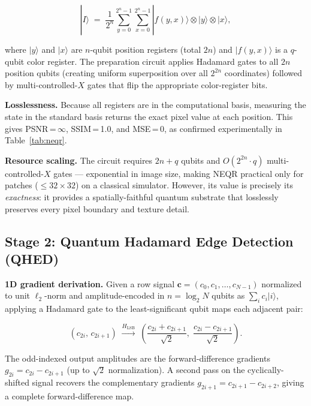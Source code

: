 \documentclass[journal]{IEEEtran}
\newcommand{\qket}[1]{|#1\rangle}
\begin{document}
\begin{equation}
  \qket{I} \;=\; \frac{1}{2^n} \sum_{y=0}^{2^n-1} \sum_{x=0}^{2^n-1}
  \qket{f(y,x)} \otimes \qket{y} \otimes \qket{x},
  \label{eq:neqr}
\end{equation}

where $\qket{y}$ and $\qket{x}$ are $n$-qubit position registers
(total $2n$) and $\qket{f(y,x)}$ is a $q$-qubit color register.  The
preparation circuit applies Hadamard gates to all $2n$ position qubits
(creating uniform superposition over all $2^{2n}$ coordinates) followed by
multi-controlled-$X$ gates that flip the appropriate color-register bits.

\textbf{Losslessness.}
Because all registers are in the computational basis, measuring the state
in the standard basis returns the exact pixel value at each position.
This gives PSNR\,=\,$\infty$, SSIM\,=\,1.0, and MSE\,=\,0, as confirmed
experimentally in Table~\ref{tab:neqr}.

\textbf{Resource scaling.}
The circuit requires $2n + q$ qubits and $O(2^{2n} \cdot q)$
multi-controlled-$X$ gates — exponential in image size, making NEQR
practical only for patches ($\leq 32\times32$) on a classical simulator.
However, its value is precisely its \emph{exactness}: it provides a
spatially-faithful quantum substrate that losslessly preserves every pixel
boundary and texture detail.

\subsection{Stage 2: Quantum Hadamard Edge Detection (QHED)}

\textbf{1D gradient derivation.}
Given a row signal $\mathbf{c} = (c_0, c_1, \ldots, c_{N-1})$ normalized to
unit $\ell_2$-norm and amplitude-encoded in $n = \log_2 N$ qubits as
$\sum_{i} c_i \qket{i}$, applying a Hadamard gate to the least-significant
qubit maps each adjacent pair:

\begin{equation}
  (c_{2i},\, c_{2i+1})
  \;\xrightarrow{H_{\text{LSB}}}\;
  \left(\frac{c_{2i}+c_{2i+1}}{\sqrt{2}},\;
        \frac{c_{2i}-c_{2i+1}}{\sqrt{2}}\right).
  \label{eq:qhed_1d}
\end{equation}

The odd-indexed output amplitudes are the forward-difference gradients
$g_{2i} = c_{2i} - c_{2i+1}$ (up to $\sqrt{2}$ normalization).  A second
pass on the cyclically-shifted signal recovers the complementary gradients
$g_{2i+1} = c_{2i+1} - c_{2i+2}$, giving a complete forward-difference map.
\end{document}
